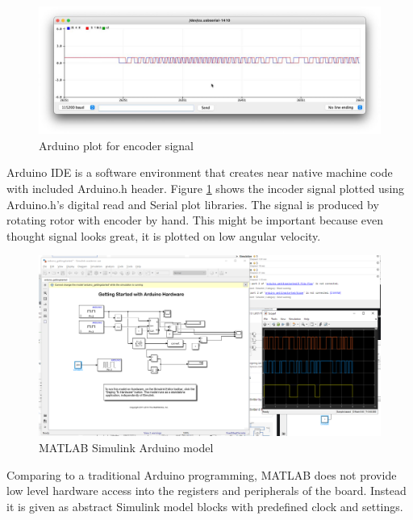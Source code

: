 \documentclass[]{final_report}
\begin{document}
\begin{figure} [h!]
\centerline{\includegraphics[width=.95\textwidth]{Screenshots for paper/arduino/encoder signal.jpeg}}
\caption{Arduino plot for encoder signal}
\label{fig:arduinoEncoder}
\end{figure}

Arduino IDE is a software environment that creates near native machine code with included Arduino.h header. Figure \ref{fig:arduinoEncoder} shows the incoder signal plotted using Arduino.h's digital read and Serial plot libraries. The signal is produced by rotating rotor with encoder by hand. This might be important because even thought signal looks great, it is plotted on low angular velocity.

\begin{figure} [h!]
\centerline{\includegraphics[width=.95\textwidth]{Screenshots for paper/arduino/Model encoder arduin MATLAB.PNG}}
\caption{MATLAB Simulink Arduino model}
\label{fig:arduinoSimulink}
\end{figure}

Comparing to a traditional Arduino programming, MATLAB does not provide low level hardware access into the registers and peripherals of the board. Instead it is given as abstract Simulink model blocks with predefined clock and settings.
\end{document}
